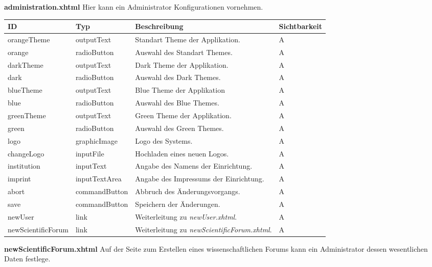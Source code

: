 \textbf{administration.xhtml} Hier kann ein Administrator Konfigurationen vornehmen.

\begin{tabular}[H]{|m{2cm}|m{3cm}|m{6cm}|m{2.5cm}|}
    \hline
    \textbf{ID} & \textbf{Typ} & \textbf{Beschreibung} & \textbf{Sichtbarkeit} \\
    \hline
    \hline
    orangeTheme & outputText & Standart Theme der Applikation. & A\\
    \hline
    orange & radioButton & Auswahl des Standart Themes. & A\\
    \hline
    darkTheme & outputText & Dark Theme der Applikation. & A\\
    \hline
    dark & radioButton & Auswahl des Dark Themes. & A\\
    \hline
    blueTheme & outputText & Blue Theme der Applikation & A\\
    \hline
    blue & radioButton & Auswahl des Blue Themes. & A\\
    \hline
    greenTheme & outputText & Green Theme der Applikation. & A\\
    \hline
    green & radioButton & Auswahl des Green Themes. & A\\
    \hline
    logo & graphicImage & Logo des Systems. & A\\
    \hline
    changeLogo & inputFile & Hochladen eines neuen Logos. & A\\
    \hline
    institution & inputText & Angabe des Namens der Einrichtung. & A\\
    \hline
    imprint & inputTextArea & Angabe des Impressums der Einrichtung. & A\\
    \hline
    abort & commandButton & Abbruch des Änderungsvorgangs. & A \\
    \hline
    save & commandButton & Speichern der Änderungen. & A\\
    \hline
    newUser & link & Weiterleitung zu \emph{newUser.xhtml}. & A\\
    \hline
    newScientificForum & link & Weiterleitung zu \emph{newScientificForum.xhtml}. & A\\
    \hline
\end{tabular}

\textbf{newScientificForum.xhtml} Auf der Seite zum Erstellen eines wissenschaftlichen Forums kann ein Administrator dessen wesentlichen Daten festlege.

